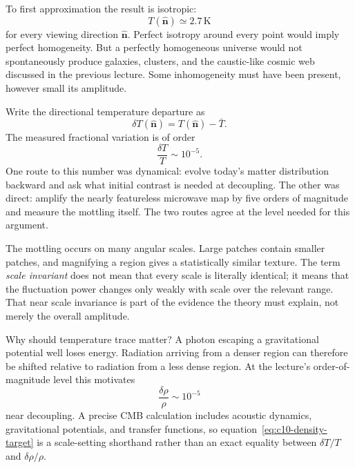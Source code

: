 \begin{classroomqa}
\end{classroomqa}

To first approximation the result is isotropic:
\[
T(\hat{\mathbf n})\simeq 2.7\,\mathrm K
\]
for every viewing direction \(\hat{\mathbf n}\). Perfect isotropy around every point would imply perfect homogeneity. But a perfectly homogeneous universe would not spontaneously produce galaxies, clusters, and the caustic-like cosmic web discussed in the previous lecture. Some inhomogeneity must have been present, however small its amplitude.

Write the directional temperature departure as
\[
\delta T(\hat{\mathbf n})=T(\hat{\mathbf n})-\bar T.
\]
The measured fractional variation is of order
\begin{equation}
\frac{\delta T}{T}\sim10^{-5}.
\label{eq:c10-cmb-anisotropy}
\end{equation}
One route to this number was dynamical: evolve today's matter distribution backward and ask what initial contrast is needed at decoupling. The other was direct: amplify the nearly featureless microwave map by five orders of magnitude and measure the mottling itself. The two routes agree at the level needed for this argument.

The mottling occurs on many angular scales. Large patches contain smaller patches, and magnifying a region gives a statistically similar texture. The term \emph{scale invariant} does not mean that every scale is literally identical; it means that the fluctuation power changes only weakly with scale over the relevant range. That near scale invariance is part of the evidence the theory must explain, not merely the overall amplitude.

Why should temperature trace matter? A photon escaping a gravitational potential well loses energy. Radiation arriving from a denser region can therefore be shifted relative to radiation from a less dense region. At the lecture's order-of-magnitude level this motivates
\begin{equation}
\frac{\delta\rho}{\rho}\sim10^{-5}
\label{eq:c10-density-target}
\end{equation}
near decoupling. A precise CMB calculation includes acoustic dynamics, gravitational potentials, and transfer functions, so equation~\eqref{eq:c10-density-target} is a scale-setting shorthand rather than an exact equality between \(\delta T/T\) and \(\delta\rho/\rho\).

